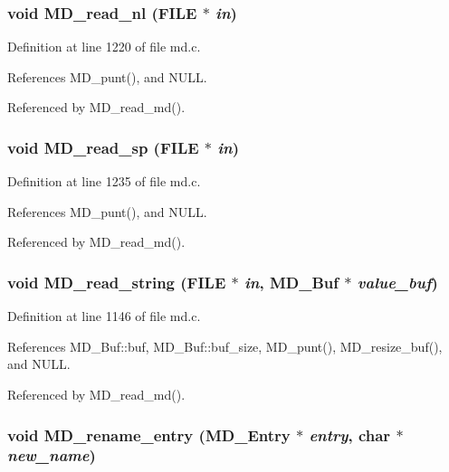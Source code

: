 \subsubsection{\setlength{\rightskip}{0pt plus 5cm}void MD\_\-read\_\-nl (FILE $\ast$ {\em in})}\label{md_8c_204c965db7eb8ae3f34ea57fce734817}




Definition at line 1220 of file md.c.

References MD\_\-punt(), and NULL.

Referenced by MD\_\-read\_\-md().
\subsubsection{\setlength{\rightskip}{0pt plus 5cm}void MD\_\-read\_\-sp (FILE $\ast$ {\em in})}\label{md_8c_168018378930272527eaafacef323813}




Definition at line 1235 of file md.c.

References MD\_\-punt(), and NULL.

Referenced by MD\_\-read\_\-md().
\subsubsection{\setlength{\rightskip}{0pt plus 5cm}void MD\_\-read\_\-string (FILE $\ast$ {\em in}, \bf{MD\_\-Buf} $\ast$ {\em value\_\-buf})}\label{md_8c_c8ee7f871c90dbb12a331ab3df1dd210}




Definition at line 1146 of file md.c.

References MD\_\-Buf::buf, MD\_\-Buf::buf\_\-size, MD\_\-punt(), MD\_\-resize\_\-buf(), and NULL.

Referenced by MD\_\-read\_\-md().
\subsubsection{\setlength{\rightskip}{0pt plus 5cm}void MD\_\-rename\_\-entry (\bf{MD\_\-Entry} $\ast$ {\em entry}, char $\ast$ {\em new\_\-name})}\label{md_8c_21f5e11ef45622d57325c409ba6a486c}




